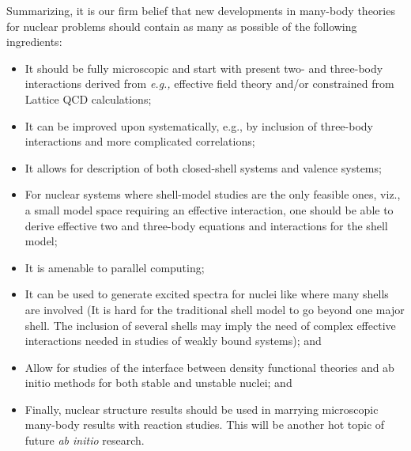Summarizing, it is our firm belief 
that new developments in many-body theories
for nuclear problems should contain as many as possible of the 
following ingredients:
\begin{itemize}
\item
It should be fully microscopic and start with present two- and three-body
interactions derived from {\it e.g.,} effective field theory and/or constrained from Lattice QCD calculations;
\item It can be improved upon systematically, e.g., by inclusion of
three-body interactions and more complicated correlations;
\item It allows for description of both closed-shell 
systems and valence systems;
\item For nuclear systems where shell-model studies are the only feasible ones,
viz., a small model space requiring an effective interaction, 
one should be able to
derive  effective two and three-body 
equations and interactions for the shell
model;
\item It is amenable to parallel computing;
\item It can be used to generate excited spectra for nuclei like 
where many shells are involved (It is hard for the traditional shell model
to go beyond one major shell.  The inclusion of several shells may imply 
the need of  complex effective interactions
needed in studies of weakly bound systems); and
\item Allow for studies of  the interface between density functional theories and ab initio methods for both  stable and unstable nuclei; and  
\item Finally, nuclear structure results should be used in marrying microscopic 
many-body results with reaction studies. This will be another hot topic
of future {\it ab initio} research.
\end{itemize}


